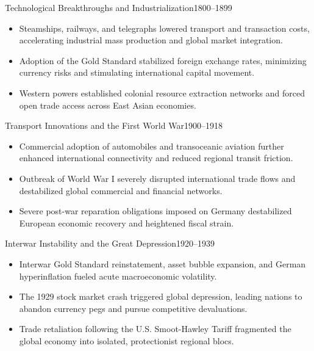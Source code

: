 \documentclass[10pt, aspectratio=169]{beamer}
\begin{document}
	\begin{frame}{Technological Breakthroughs and Industrialization}{1800--1899}
		\begin{itemize}
			\item Steamships, railways, and telegraphs lowered transport and transaction costs, accelerating industrial mass production and global market integration.
			\vspace{0.25cm}
			\item Adoption of the Gold Standard stabilized foreign exchange rates, minimizing currency risks and stimulating international capital movement.
			\vspace{0.25cm}
			\item Western powers established colonial resource extraction networks and forced open trade access across East Asian economies.
		\end{itemize}
	\end{frame}
	
	\begin{frame}{Transport Innovations and the First World War}{1900--1918}
		\begin{itemize}
			\item Commercial adoption of automobiles and transoceanic aviation further enhanced international connectivity and reduced regional transit friction.
			\vspace{0.25cm}
			\item Outbreak of World War I severely disrupted international trade flows and destabilized global commercial and financial networks.
			\vspace{0.25cm}
			\item Severe post-war reparation obligations imposed on Germany destabilized European economic recovery and heightened fiscal strain.
		\end{itemize}
	\end{frame}
	
	\begin{frame}{Interwar Instability and the Great Depression}{1920--1939}
		\begin{itemize}
			\item Interwar Gold Standard reinstatement, asset bubble expansion, and German hyperinflation fueled acute macroeconomic volatility.
			\vspace{0.25cm}
			\item The 1929 stock market crash triggered global depression, leading nations to abandon currency pegs and pursue competitive devaluations.
			\vspace{0.25cm}
			\item Trade retaliation following the U.S. Smoot-Hawley Tariff fragmented the global economy into isolated, protectionist regional blocs.
		\end{itemize}
	\end{frame}
	
\end{document}
